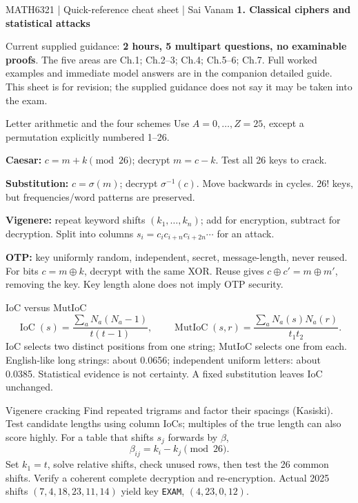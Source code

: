 \documentclass[11pt,a4paper]{article}
\begin{document}
\small
\begin{concept}{MATH6321 | Quick-reference cheat sheet | Sai Vanam}
\Large\textbf{1. Classical ciphers and statistical attacks}\small

Current supplied guidance: \textbf{2 hours, 5 multipart questions, no examinable proofs}. The five areas are Ch.1; Ch.2--3; Ch.4; Ch.5--6; Ch.7. Full worked examples and immediate model answers are in the companion detailed guide. This sheet is for revision; the supplied guidance does not say it may be taken into the exam.
\end{concept}
\begin{concept}{Letter arithmetic and the four schemes}
Use \(A=0,\ldots,Z=25\), except a permutation explicitly numbered 1--26.

\textbf{Caesar:} \(c=m+k\pmod{26}\); decrypt \(m=c-k\). Test all 26 keys to crack.

\textbf{Substitution:} \(c=\sigma(m)\); decrypt \(\sigma^{-1}(c)\). Move backwards in cycles. \(26!\) keys, but frequencies/word patterns are preserved.

\textbf{Vigenere:} repeat keyword shifts \((k_1,\ldots,k_n)\); add for encryption, subtract for decryption. Split into columns \(s_i=c_ic_{i+n}c_{i+2n}\cdots\) for an attack.

\textbf{OTP:} key uniformly random, independent, secret, message-length, never reused. For bits \(c=m\oplus k\), decrypt with the same XOR. Reuse gives \(c\oplus c'=m\oplus m'\), removing the key. Key length alone does not imply OTP security.
\end{concept}
\begin{concept}{IoC versus MutIoC}
\[\operatorname{IoC}(s)=\frac{\sum_aN_a(N_a-1)}{t(t-1)},\qquad
\operatorname{MutIoC}(s,r)=\frac{\sum_aN_a(s)N_a(r)}{t_1t_2}.\]
IoC selects two distinct positions from one string; MutIoC selects one from each. English-like long strings: about 0.0656; independent uniform letters: about 0.0385. Statistical evidence is not certainty. A fixed substitution leaves IoC unchanged.
\end{concept}
\begin{method}{Vigenere cracking}
Find repeated trigrams and factor their spacings (Kasiski). Test candidate lengths using column IoCs; multiples of the true length can also score highly. For a table that shifts \(s_j\) forwards by \(\beta\),
\[\boxed{\beta_{ij}=k_i-k_j\pmod{26}.}\]
Set \(k_1=t\), solve relative shifts, check unused rows, then test the 26 common shifts. Verify a coherent complete decryption and re-encryption. Actual 2025 shifts \((7,4,18,23,11,14)\) yield key \texttt{EXAM}, \((4,23,0,12)\).
\end{method}
\end{document}
